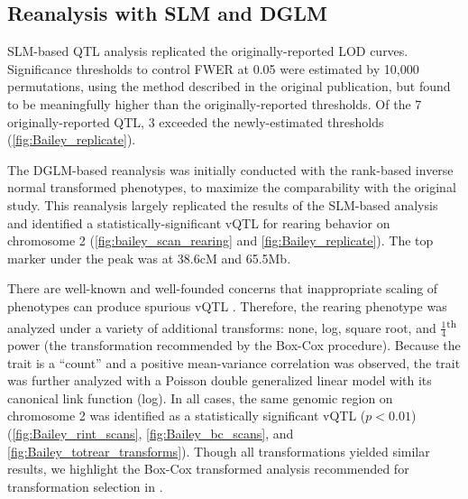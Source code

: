     \subsection{Reanalysis with SLM and DGLM}
    SLM-based QTL analysis replicated the originally-reported LOD curves.
    Significance thresholds to control FWER at 0.05 were estimated by 10,000 permutations, using the method described in the original publication, but found to be meaningfully higher than the originally-reported thresholds.
    Of the 7 originally-reported QTL, 3 exceeded the newly-estimated thresholds (\autoref{fig:Bailey_replicate}).

    The DGLM-based reanalysis was initially conducted with the rank-based inverse normal transformed phenotypes, to maximize the comparability with the original study.
    This reanalysis largely replicated the results of the SLM-based analysis and identified a statistically-significant vQTL for rearing behavior on chromosome 2 (\autoref{fig:bailey_scan_rearing} and \autoref{fig:Bailey_replicate}).
    The top marker under the peak was at 38.6cM and 65.5Mb.

    There are well-known and well-founded concerns that inappropriate scaling of phenotypes can produce spurious vQTL \citep{Ronnegard2012,Sun2013a,Shen2013}.
    Therefore, the rearing phenotype was analyzed under a variety of additional transforms: none, log, square root, and $\frac{1}{4}$\textsuperscript{th} power (the transformation recommended by the Box-Cox procedure).
    Because the trait is a ``count'' and a positive mean-variance correlation was observed, the trait was further analyzed with a Poisson double generalized linear model with its canonical link function (log).
    In all cases, the same genomic region on chromosome 2 was identified as a statistically significant vQTL ($p < 0.01$) (\autoref{fig:Bailey_rint_scans}, \autoref{fig:Bailey_bc_scans}, and \autoref{fig:Bailey_totrear_transforms}).
    Though all transformations yielded similar results, we highlight the Box-Cox transformed analysis recommended for transformation selection in \citet{Ronnegard2011a}.

